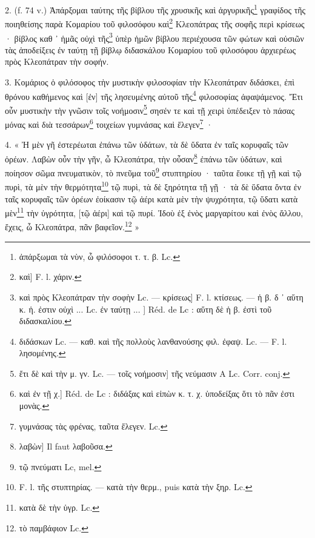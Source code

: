 \documentclass[a4paper, 11pt, oneside, polutonikogreek, french]{article}
\begin{document}
2. (f. 74 v.) Ἀπάρξομαι ταύτης τῆς βίβλου τῆς χρυσικῆς καὶ ἀργυρικῆς\footnote{ἀπάρξωμαι τὰ νὺν, ὦ φιλόσοφοι τ. τ. β. Lc.} γραφίδος τῆς ποιηθείσης παρὰ Κομαρίου τοῦ φιλοσόφου καὶ\footnote{καὶ] F. l. χάριν.} Κλεοπάτρας τῆς σοφῆς περὶ κρίσεως · βίβλος καθ ᾽ ἡμᾶς οὐχὶ τῆς\footnote{καὶ πρὸς Κλεοπάτραν τὴν σοφὴν Lc. --- κρίσεως] F. l. κτίσεως. --- ἡ β. δ ᾽ αὕτη κ. ἡ. ἐστιν οὐχὶ ... Lc. ἐν ταύτῃ ... ] Réd. de Lc : αὕτη δὲ ἡ β. ἐστὶ τοῦ διδασκαλίου.} ὑπὲρ ἡμῶν βίβλου περιέχουσα τῶν φώτων καὶ οὐσιῶν τὰς ἀποδείξεις ἐν ταύτῃ τῇ βίβλῳ διδασκάλου Κομαρίου τοῦ φιλοσόφου ἀρχιερέως πρὸς Κλεοπάτραν τὴν σοφήν.

3. Κομάριος ὁ φιλόσοφος τὴν μυστικὴν φιλοσοφίαν τὴν Κλεοπάτραν διδάσκει, ἐπὶ θρόνου καθήμενος καὶ [ἐν] τῆς λησευμένης αὐτοῦ τῆς\footnote{διδάσκων Lc. --- καθ. καὶ τῆς πολλοὺς λανθανούσης φιλ. ἐφαψ. Lc. --- F. l. λησομένης.} φιλοσοφίας ἀφαψάμενος. Ἔτι οὖν μυστικὴν τὴν γνῶσιν τοῖς νοήμοσιν\footnote{ἔτι δὲ καὶ τὴν μ. γν. Lc. --- τοῖς νοήμοσιν] τῆς νεύμασιν A Lc. Corr. conj.} σησέν τε καὶ τῇ χειρὶ ὑπέδειξεν τὸ πάσας μόνας καὶ διὰ τεσσάρων\footnote{καὶ ἐν τῇ χ.] Réd. de Lc : διδάξας καὶ εἰπὼν κ. τ. χ. ὑποδείξας ὅτι τὸ πᾶν ἐστι μονὰς.} τοιχείων γυμνάσας καὶ ἔλεγεν\footnote{γυμνάσας τὰς φρένας, ταῦτα ἕλεγεν. Lc.} ·

4. « Ἠ μὲν γῆ ἐστερέωται ἐπάνω τῶν ὑδάτων, τὰ δὲ ὕδατα ἐν ταῖς κορυφαῖς τῶν ὀρέων. Λαβὼν οὖν τὴν γῆν, ὦ Κλεοπάτρα, τὴν οὖσαν\footnote{λαβὼν] Il faut λαβοῦσα.} ἐπάνω τῶν ὑδάτων, καὶ ποίησον σῶμα πνευματικὸν, τὸ πνεῦμα τοῦ\footnote{τῷ πνεύματι Lc, mel.} στυπτηρίου · ταῦτα ἔοικε τῇ γῇ καὶ τῷ πυρὶ, τὰ μὲν τὴν θερμότητα\footnote{F. l. τῆς στυπτηρίας. --- κατὰ τὴν θερμ., puis κατὰ τὴν ξηρ. Lc.} τῷ πυρὶ, τὰ δὲ ξηρότητα τῇ γῇ · τὰ δὲ ὕδατα ὄντα ἐν ταῖς κορυφαῖς τῶν ὀρέων ἐοίκασιν τῷ ἀέρι κατὰ μὲν τὴν ψυχρότητα, τῷ ὕδατι κατὰ μὲν\footnote{κατὰ δὲ τὴν ὑγρ. Lc.} τὴν ὐγρότητα, [τῷ ἀέρι] καὶ τῷ πυρί. Ἰδοὺ ἐξ ἐνὸς μαργαρίτου καὶ ἐνὸς ἄλλου, ἔχεις, ὦ Κλεοπάτρα, πᾶν βαφεῖον.\footnote{τὸ παμβάφιον Lc.} »
\end{document}
